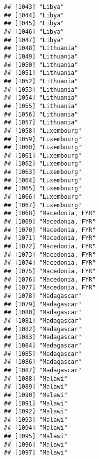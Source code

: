 \documentclass[]{article}
\begin{document}
\begin{verbatim}
## [1043] "Libya"                              
## [1044] "Libya"                              
## [1045] "Libya"                              
## [1046] "Libya"                              
## [1047] "Libya"                              
## [1048] "Lithuania"                          
## [1049] "Lithuania"                          
## [1050] "Lithuania"                          
## [1051] "Lithuania"                          
## [1052] "Lithuania"                          
## [1053] "Lithuania"                          
## [1054] "Lithuania"                          
## [1055] "Lithuania"                          
## [1056] "Lithuania"                          
## [1057] "Lithuania"                          
## [1058] "Luxembourg"                         
## [1059] "Luxembourg"                         
## [1060] "Luxembourg"                         
## [1061] "Luxembourg"                         
## [1062] "Luxembourg"                         
## [1063] "Luxembourg"                         
## [1064] "Luxembourg"                         
## [1065] "Luxembourg"                         
## [1066] "Luxembourg"                         
## [1067] "Luxembourg"                         
## [1068] "Macedonia, FYR"                     
## [1069] "Macedonia, FYR"                     
## [1070] "Macedonia, FYR"                     
## [1071] "Macedonia, FYR"                     
## [1072] "Macedonia, FYR"                     
## [1073] "Macedonia, FYR"                     
## [1074] "Macedonia, FYR"                     
## [1075] "Macedonia, FYR"                     
## [1076] "Macedonia, FYR"                     
## [1077] "Macedonia, FYR"                     
## [1078] "Madagascar"                         
## [1079] "Madagascar"                         
## [1080] "Madagascar"                         
## [1081] "Madagascar"                         
## [1082] "Madagascar"                         
## [1083] "Madagascar"                         
## [1084] "Madagascar"                         
## [1085] "Madagascar"                         
## [1086] "Madagascar"                         
## [1087] "Madagascar"                         
## [1088] "Malawi"                             
## [1089] "Malawi"                             
## [1090] "Malawi"                             
## [1091] "Malawi"                             
## [1092] "Malawi"                             
## [1093] "Malawi"                             
## [1094] "Malawi"                             
## [1095] "Malawi"                             
## [1096] "Malawi"                             
## [1097] "Malawi"                             

\end{verbatim}
\end{document}
